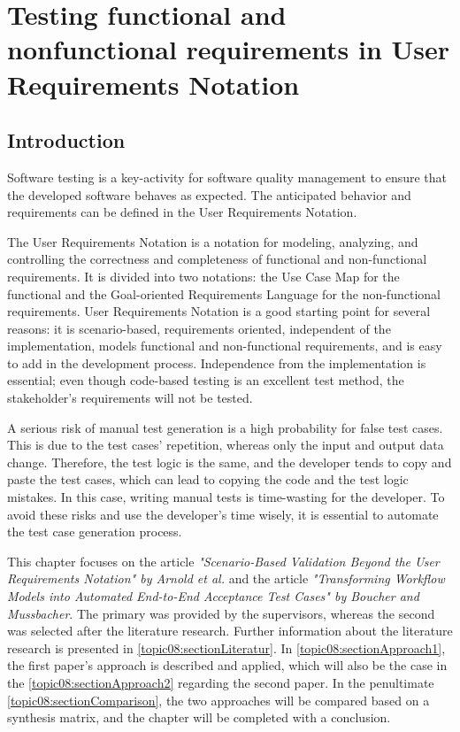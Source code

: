 \chapter{Testing functional and nonfunctional requirements in User Requirements Notation}
\section{Introduction}

Software testing is a key-activity for software quality management to ensure that the developed software behaves as expected. The anticipated behavior and requirements can be defined in the User Requirements Notation. 

The User Requirements Notation is a notation for modeling, analyzing, and controlling the correctness and completeness of functional and non-functional requirements. It is divided into two notations: the Use Case Map for the functional and the Goal-oriented Requirements Language for the non-functional requirements. User Requirements Notation is a good starting point for several reasons: it is scenario-based, requirements oriented, independent of the implementation, models functional and non-functional requirements, and is easy to add in the development process. Independence from the implementation is essential; even though code-based testing is an excellent test method, the stakeholder's requirements will not be tested.

A serious risk of manual test generation is a high probability for false test cases. This is due to the test cases' repetition, whereas only the input and output data change. Therefore, the test logic is the same, and the developer tends to copy and paste the test cases, which can lead to copying the code and the test logic mistakes. In this case, writing manual tests is time-wasting for the developer.  To avoid these risks and use the developer's time wisely, it is essential to automate the test case generation process.

This chapter focuses on the article \textit{"Scenario-Based Validation Beyond the User Requirements Notation" by Arnold et al.}\cite{ArnoldCorriveauShi2010} and the article \textit{"Transforming Workflow Models into Automated End-to-End Acceptance Test Cases" by Boucher and Mussbacher}\cite{BoucherMussbacher2017}. The primary was provided by the supervisors, whereas the second was selected after the literature research. Further information about the literature research is presented in \autoref{topic08:sectionLiteratur}. In \autoref{topic08:sectionApproach1}, the first paper's approach is described and applied, which will also be the case in the \autoref{topic08:sectionApproach2} regarding the second paper. In the penultimate \autoref{topic08:sectionComparison}, the two approaches will be compared based on a synthesis matrix, and the chapter will be completed with a conclusion.

